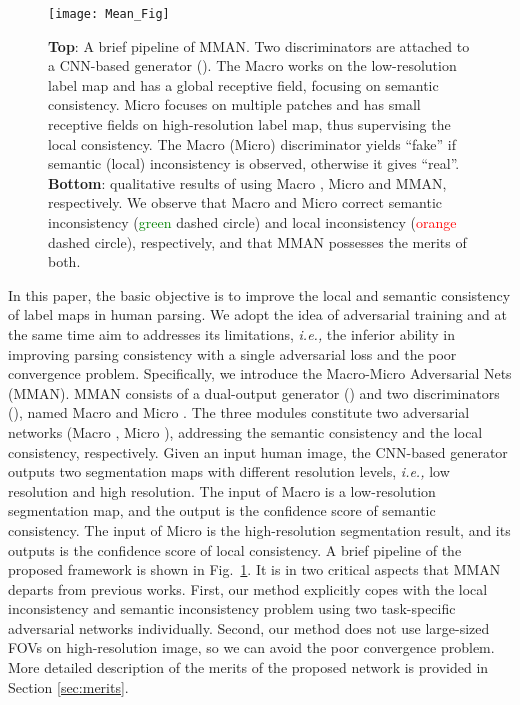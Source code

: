 \documentclass[runningheads]{llncs}
\begin{document}
\begin{figure}[t]
\centering
\texttt{[image: Mean\_Fig]}
\caption{\textbf{Top}: A brief pipeline of MMAN. Two discriminators are attached to a CNN-based generator (). The Macro  works on the low-resolution label map and has a global receptive field, focusing on semantic consistency. Micro  focuses on multiple patches and has small receptive fields on high-resolution label map, thus supervising the local consistency. The Macro (Micro) discriminator yields ``fake'' if semantic (local) inconsistency is observed, otherwise it gives ``real''. \textbf{Bottom}:  qualitative results of using Macro , Micro  and MMAN, respectively. We observe that Macro  and Micro  correct semantic inconsistency (\textcolor{green}{green} dashed circle) and local inconsistency (\textcolor{red}{orange} dashed circle), respectively, and that MMAN possesses the merits of both.}
\label{fig:Brief}
\end{figure}

In this paper, the basic objective is to improve the local and semantic consistency of label maps in human parsing. We adopt the idea of adversarial training and at the same time aim to addresses its limitations, \emph{i.e.,} the inferior ability in improving parsing consistency with a single adversarial loss and the poor convergence problem. Specifically, we introduce the Macro-Micro Adversarial Nets (MMAN).
MMAN consists of a dual-output generator () and two discriminators (), named Macro  and Micro . The three modules constitute two adversarial networks (Macro , Micro ), addressing the semantic consistency and the local consistency, respectively. Given an input human image, the CNN-based generator outputs two segmentation maps with different resolution levels, \emph{i.e.,} low resolution and high resolution. The input of Macro  is a low-resolution segmentation map, and the output is the confidence score of semantic consistency. The input of Micro  is the high-resolution segmentation result, and its outputs is the confidence score of local consistency. A brief pipeline of the proposed framework is shown in Fig.~\ref{fig:Brief}.
It is in two critical aspects that MMAN departs from previous works.
First, our method explicitly copes with the local inconsistency and semantic inconsistency problem using two task-specific adversarial networks individually. Second, our method does not use large-sized FOVs on high-resolution image, so we can avoid the poor convergence problem. More detailed description of the merits of the proposed network is provided in Section \ref{sec:merits}.
\end{document}

